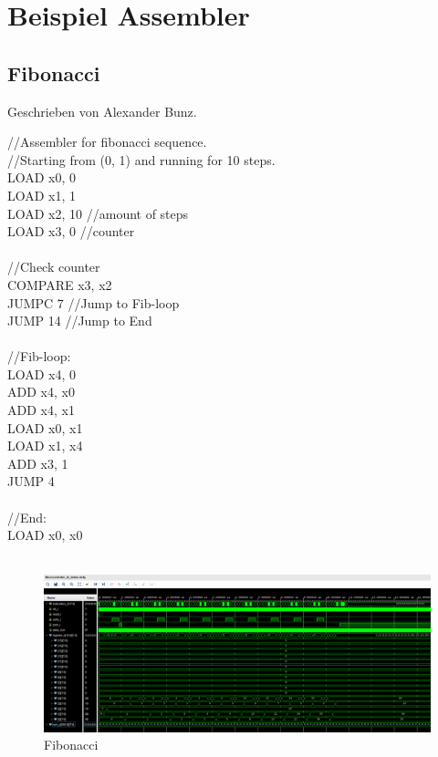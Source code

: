 \documentclass[bibliography=totoc,listof=totoc,index=totoc]{scrartcl}
\begin{document}
\section{Beispiel Assembler}\label{sec:BeispielAssembler}

\subsection{Fibonacci}
Geschrieben von Alexander Bunz.
\begin{multicols}{2}
\begin{small}
//Assembler for fibonacci sequence.\\
//Starting from (0, 1) and running for 10 steps.\\
LOAD x0, 0\\
LOAD x1, 1\\
LOAD x2, 10 //amount of steps\\
LOAD x3, 0 //counter\\
\\
//Check counter\\
COMPARE x3, x2\\
JUMPC 7 //Jump to Fib-loop\\
JUMP 14 //Jump to End\\
\\
//Fib-loop:\\
LOAD x4, 0\\
ADD x4, x0\\
ADD x4, x1\\
LOAD x0, x1\\
LOAD x1, x4\\
ADD x3, 1\\
JUMP 4\\
\\
//End:\\
LOAD x0, x0\\
\\
\end{small}
\end{multicols}
\begin{figure}[H]
    \centering
    \includegraphics[width=\textwidth]{Fibonacci.png}
    \caption{Fibonacci}
    \label{fig:Fibonacci}
\end{figure}
\end{document}

